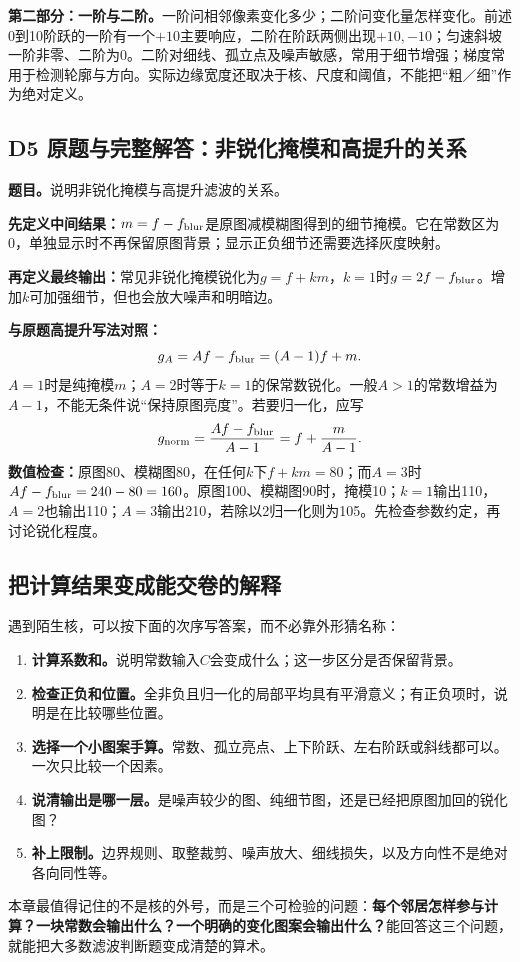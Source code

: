 \textbf{第二部分：一阶与二阶。}一阶问相邻像素变化多少；二阶问变化量怎样变化。前述0到10阶跃的一阶有一个$+10$主要响应，二阶在阶跃两侧出现$+10,-10$；匀速斜坡一阶非零、二阶为0。二阶对细线、孤立点及噪声敏感，常用于细节增强；梯度常用于检测轮廓与方向。实际边缘宽度还取决于核、尺度和阈值，不能把“粗／细”作为绝对定义。

\subsection{D5 原题与完整解答：非锐化掩模和高提升的关系}
\label{original:D5}
\textbf{题目。}说明非锐化掩模与高提升滤波的关系。

\textbf{先定义中间结果：}$m=f-f_{\rm blur}$是原图减模糊图得到的细节掩模。它在常数区为0，单独显示时不再保留原图背景；显示正负细节还需要选择灰度映射。

\textbf{再定义最终输出：}常见非锐化掩模锐化为$g=f+km$，$k=1$时$g=2f-f_{\rm blur}$。增加$k$可加强细节，但也会放大噪声和明暗边。

\textbf{与原题高提升写法对照：}
\[
 g_A=Af-f_{\rm blur}=(A-1)f+m.
\]
$A=1$时是纯掩模$m$；$A=2$时等于$k=1$的保常数锐化。一般$A>1$的常数增益为$A-1$，不能无条件说“保持原图亮度”。若要归一化，应写
\[
 g_{\rm norm}=\frac{Af-f_{\rm blur}}{A-1}
 =f+\frac{m}{A-1}.
\]
\textbf{数值检查：}原图80、模糊图80，在任何$k$下$f+km=80$；而$A=3$时$Af-f_{\rm blur}=240-80=160$。原图100、模糊图90时，掩模10；$k=1$输出110，$A=2$也输出110；$A=3$输出210，若除以2归一化则为105。先检查参数约定，再讨论锐化程度。

\subsection{把计算结果变成能交卷的解释}
遇到陌生核，可以按下面的次序写答案，而不必靠外形猜名称：
\begin{enumerate}[label=\arabic*.]
 \item \textbf{计算系数和。}说明常数输入$C$会变成什么；这一步区分是否保留背景。
 \item \textbf{检查正负和位置。}全非负且归一化的局部平均具有平滑意义；有正负项时，说明是在比较哪些位置。
 \item \textbf{选择一个小图案手算。}常数、孤立亮点、上下阶跃、左右阶跃或斜线都可以。一次只比较一个因素。
 \item \textbf{说清输出是哪一层。}是噪声较少的图、纯细节图，还是已经把原图加回的锐化图？
 \item \textbf{补上限制。}边界规则、取整裁剪、噪声放大、细线损失，以及方向性不是绝对各向同性等。
\end{enumerate}
本章最值得记住的不是核的外号，而是三个可检验的问题：\textbf{每个邻居怎样参与计算？一块常数会输出什么？一个明确的变化图案会输出什么？}能回答这三个问题，就能把大多数滤波判断题变成清楚的算术。
